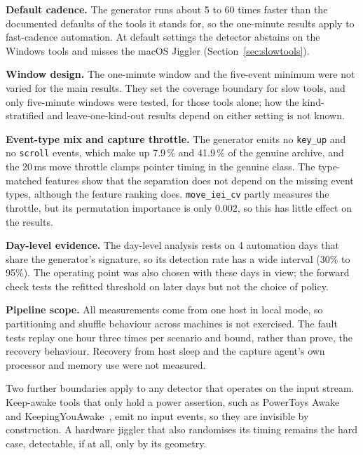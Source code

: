 \documentclass[sensors,article,submit,pdftex,oneauthor]{Definitions/mdpi}
\begin{document}
\textbf{Default cadence.} The generator runs about 5 to 60 times faster than the documented defaults of the tools it stands for, so the one-minute results apply to fast-cadence automation. At default settings the detector abstains on the Windows tools and misses the macOS Jiggler (Section~\ref{sec:slowtools}).

\textbf{Window design.} The one-minute window and the five-event minimum were not varied for the main results. They set the coverage boundary for slow tools, and only five-minute windows were tested, for those tools alone; how the kind-stratified and leave-one-kind-out results depend on either setting is not known.

\textbf{Event-type mix and capture throttle.} The generator emits no \texttt{key\_up} and no \texttt{scroll} events, which make up 7.9\,\% and 41.9\,\% of the genuine archive, and the 20\,ms move throttle clamps pointer timing in the genuine class. The type-matched features show that the separation does not depend on the missing event types, although the feature ranking does. \texttt{move\_iei\_cv} partly measures the throttle, but its permutation importance is only 0.002, so this has little effect on the results.

\textbf{Day-level evidence.} The day-level analysis rests on 4 automation days that share the generator's signature, so its detection rate has a wide interval (30\% to 95\%). The operating point was also chosen with these days in view; the forward check tests the refitted threshold on later days but not the choice of policy.

\textbf{Pipeline scope.} All measurements come from one host in local mode, so partitioning and shuffle behaviour across machines is not exercised. The fault tests replay one hour three times per scenario and bound, rather than prove, the recovery behaviour. Recovery from host sleep and the capture agent's own processor and memory use were not measured.

Two further boundaries apply to any detector that operates on the input stream. Keep-awake tools that only hold a power assertion, such as PowerToys Awake~\cite{powertoysawake} and KeepingYouAwake~\cite{keepingyouawake}, emit no input events, so they are invisible by construction. A hardware jiggler that also randomises its timing remains the hard case, detectable, if at all, only by its geometry.
\end{document}
